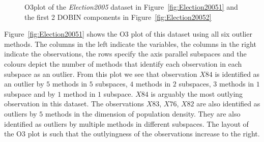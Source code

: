 \documentclass[a4paper,11pt]{article}
\begin{document}
\begin{figure}[!ht]
	\centering
	\caption{O3plot of the \textit{Election2005} dataset in Figure~\ref{fig:Election20051} and the first 2 DOBIN components in Figure~\ref{fig:Election20052} }
	\label{fig:Election2005}
\end{figure}

Figure~\ref{fig:Election20051} shows the O3 plot of this dataset using all six outlier methods. The columns in the left indicate the variables, the columns in the right indicate the observations, the rows specify the axis parallel subspaces and the colours depict the number of methods that identify each observation in each subspace as an outlier. From this plot we see that observation $X84$ is identified as an outlier by $5$ methods in $5$ subspaces, $4$ methods in $2$ subspaces, $3$ methods in $1$ subspace and by $1$ method in $1$ subspace. $X84$ is arguably the most outlying observation in this dataset. The observations $X83$, $X76$, $X82$ are also identified as outliers by $5$ methods in the dimension of population density. They are also identified as outliers by multiple methods in different subspaces. The layout of the O3 plot is such that the outlyingness of the observations increase to the right. \\
\end{document}

